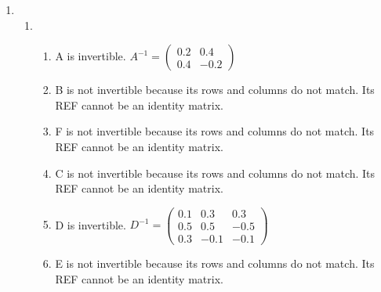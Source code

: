 \documentclass{article}
\begin{document}
\begin{enumerate}
\begin{enumerate}
\end{enumerate}

\item

\begin{enumerate}

\item

\begin{enumerate}

\item A is invertible. $A^{-1} =  \left(\begin{array}{cc} 0.2 & 0.4 \\ 0.4 & -0.2 \end{array} \right)$
\item B is not invertible because its rows and columns do not match. Its REF cannot be an identity matrix.
\item F is not invertible because its rows and columns do not match. Its REF cannot be an identity matrix.
\item C is not invertible because its rows and columns do not match. Its REF cannot be an identity matrix.
\item D is invertible. $D^{-1} =  \left(\begin{array}{ccc} 0.1 & 0.3 & 0.3 \\ 0.5 & 0.5 & -0.5 \\ 0.3 & -0.1 & -0.1 \end{array} \right)$
\item E is not invertible because its rows and columns do not match. Its REF cannot be an identity matrix.

\end {enumerate}


\end{enumerate}
\end{enumerate}
\end{document}
